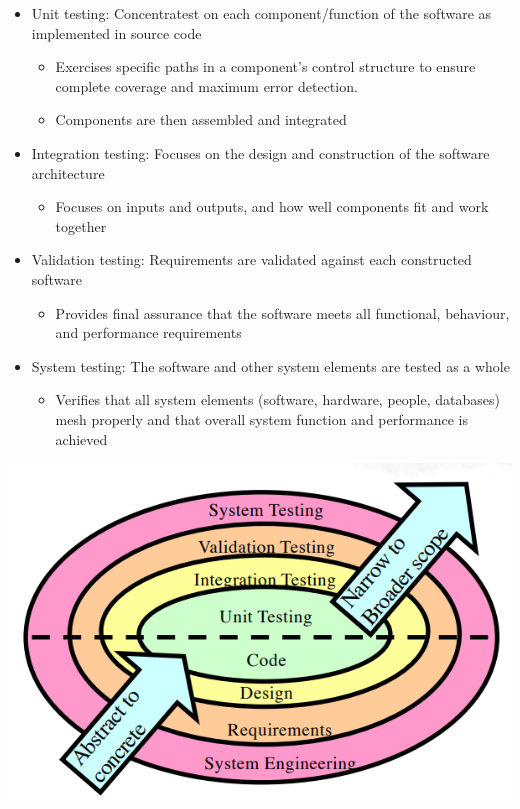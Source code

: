 \documentclass{article}
\begin{document}
\begin{itemize}
  \item Unit testing: Concentratest on each component/function of the software as implemented in source code
  \begin{itemize}
    \item Exercises specific paths in a component's control structure to ensure complete coverage and maximum error detection.
    \item Components are then assembled and integrated
  \end{itemize}
  \item Integration testing: Focuses on the design and construction of the software architecture
  \begin{itemize}
    \item Focuses on inputs and outputs, and how well components fit and work together
  \end{itemize}
  \item Validation testing: Requirements are validated against each constructed software
  \begin{itemize}
    \item Provides final assurance that the software meets all functional, behaviour, and performance requirements
  \end{itemize}
  \item System testing: The software and other system elements are tested as a whole
  \begin{itemize}
    \item Verifies that all system elements (software, hardware, people, databases) mesh properly and that overall system function and performance is achieved
  \end{itemize}
\end{itemize}

\begin{center}
  \includegraphics[scale=0.5]{testing_strategy.png}
\end{center}
\end{document}

